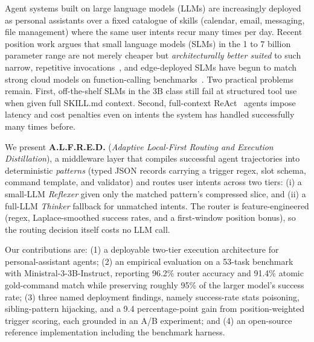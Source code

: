 Agent systems built on large language models (LLMs) are increasingly deployed as personal assistants over a fixed catalogue of skills (calendar, email, messaging, file management) where the same user intents recur many times per day. Recent position work argues that small language models (SLMs) in the 1 to 7 billion parameter range are not merely cheaper but \emph{architecturally better suited} to such narrow, repetitive invocations~\cite{belcak2025slm}, and edge-deployed SLMs have begun to match strong cloud models on function-calling benchmarks~\cite{erdogan2024tinyagent}. Two practical problems remain. First, off-the-shelf SLMs in the 3B class still fail at structured tool use when given full SKILL.md context. Second, full-context ReAct~\cite{yao2022react} agents impose latency and cost penalties even on intents the system has handled successfully many times before.

We present \textbf{A.L.F.R.E.D.} (\textit{Adaptive Local-First Routing and Execution Distillation}), a middleware layer that compiles successful agent trajectories into deterministic \emph{patterns} (typed JSON records carrying a trigger regex, slot schema, command template, and validator) and routes user intents across two tiers: (i) a small-LLM \textit{Reflexer} given only the matched pattern's compressed slice, and (ii) a full-LLM \textit{Thinker} fallback for unmatched intents. The router is feature-engineered (regex, Laplace-smoothed success rates, and a first-window position bonus), so the routing decision itself costs no LLM call.

Our contributions are: (1) a deployable two-tier execution architecture for personal-assistant agents; (2) an empirical evaluation on a 53-task benchmark with Ministral-3-3B-Instruct, reporting 96.2\% router accuracy and 91.4\% atomic gold-command match while preserving roughly 95\% of the larger model's success rate; (3) three named deployment findings, namely success-rate stats poisoning, sibling-pattern hijacking, and a 9.4 percentage-point gain from position-weighted trigger scoring, each grounded in an A/B experiment; and (4) an open-source reference implementation including the benchmark harness.

